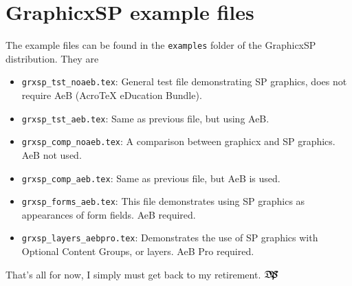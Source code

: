 \documentclass{article}
\let\pkg\textsf
\def\dps{$\hbox{$\mathfrak D$\kern-.3em\hbox{$\mathfrak P$}%
   \kern-.6em \hbox{$\mathcal S$}}$}
\begin{document}
\section{\texorpdfstring{\protect\pkg{GraphicxSP}}{GraphicxSP} example files}

The example files can be found in the \texttt{examples} folder of the \pkg{GraphicxSP}
distribution. They are
\begin{itemize}
\item \texttt{grxsp\_tst\_noaeb.tex}: General test file demonstrating SP graphics,
    does not require AeB (Acro\negthinspace\TeX{} eDucation Bundle).
\item \texttt{grxsp\_tst\_aeb.tex}: Same as previous file, but using AeB.
\item \texttt{grxsp\_comp\_noaeb.tex}: A comparison between graphicx 
    and SP graphics. AeB not used.
\item \texttt{grxsp\_comp\_aeb.tex}: Same as previous file, but AeB is used.
\item \texttt{grxsp\_forms\_aeb.tex}: This file demonstrates using SP graphics as appearances
    of form fields. AeB required.
\item \texttt{grxsp\_layers\_aebpro.tex}: Demonstrates the use of SP graphics with
    Optional Content Groups, or layers. AeB Pro required.
\end{itemize}

\noindent
That's all for now, I simply must get back to my retirement. \dps
\end{document}
